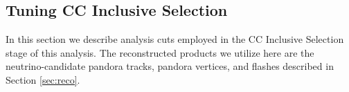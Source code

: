 %
%
%
%


\subsection{Tuning CC Inclusive Selection}
In this section we describe analysis cuts employed in the CC Inclusive Selection stage of this analysis. The reconstructed products we utilize here are the neutrino-candidate pandora tracks, pandora vertices, and flashes described in Section \ref{sec:reco}. 

